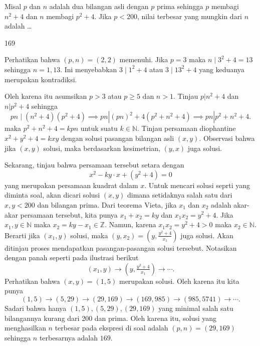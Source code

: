 \begin{soalbaru}
Misal $p$ dan $n$ adalah dua bilangan asli dengan $p$ prima sehingga $p$ membagi $n^2+4$ dan $n$ membagi $p^2+4$. Jika $p<200$, nilai terbesar yang mungkin dari $n$ adalah \dots
\end{soalbaru}
\begin{jawaban}
169
\end{jawaban}
\begin{solusi}
Perhatikan bahwa $(p,n) = (2,2)$ memenuhi. Jika $p = 3$ maka $n \mid 3^2+4 = 13$ sehingga $n=1,13$. Ini menyebabkan $3 \mid 1^2+4$ atau $3 \mid 13^2 + 4$ yang keduanya merupakan kontradiksi. 

Oleh karena itu asumsikan $p> 3$ atau $p \ge 5$ dan $n > 1$. Tinjau $p | n^2+4$ dan $n | p^2+4$ sehingga
$$pn \mid (n^2+4)(p^2+4) \implies pn | (pn)^2 + 4(p^2 + n^2 + 4) \implies pn | p^2+n^2+4.$$
maka $p^2+n^2+4 = kpn$ untuk suatu $k\in \mathbb{N}$. Tinjau persamaan diophantine $x^2+y^2+4=kxy$ dengan solusi pasangan bilangan asli $(x,y)$. Observasi bahwa jika $(x,y)$ solusi, maka berdasarkan kesimetrian, $(y,x)$ juga solusi. 

Sekarang, tinjau bahwa persamaan tersebut setara dengan
$$x^2 -ky \cdot x + (y^2+4)=0$$
yang merupakan persamaan kuadrat dalam $x$. Untuk mencari solusi seprti yang diminta soal, akan dicari solusi $(x,y)$ dimana setidaknya salah satu dari $x,y < 200$ dan bilangan prima. Dari teorema Vieta, jika $x_1$ dan $x_2$ adalah akar-akar persamaan tersebut, kita punya $x_1 + x_2 = ky$ dan $x_1x_2 = y^2+4$. Jika $x_1, y \in \mathbb{N}$ maka $x_2 = ky - x_1 \in \mathbb{Z}$. Namun, karena $x_1x_2 = y^2 + 4 > 0$ maka $x_2 \in \mathbb{N}$. Berarti jika $(x_1, y)$ solusi, maka $(y, x_2) = (y, \frac{y^2+4}{x_1})$ juga solusi. Akan ditinjau proses mendapatkan pasangan-pasangan solusi tersebut. Notasikan dengan panah seperti pada ilustrasi berikut
$$(x_1, y) \rightarrow (y, \tfrac{y^2+4}{x_1}) \rightarrow \cdots .$$
Perhatikan bahwa $(x,y)=(1,5)$ merupakan solusi. Oleh karena itu kita punya
$$(1,5) \rightarrow (5,29) \rightarrow (29, 169) \rightarrow (169, 985) \rightarrow (985, 5741) \rightarrow \cdots .$$
Sadari bahwa hanya $(1,5),(5,29),(29,169)$ yang minimal salah satu bilangannya kurang dari 200 dan prima. Oleh karena itu, solusi yang menghasilkan $n$ terbesar pada ekspresi di soal adalah $(p,n) = (29, 169)$ sehingga $n$ terbesarnya adalah $\boxed{169}$.
\end{solusi}
